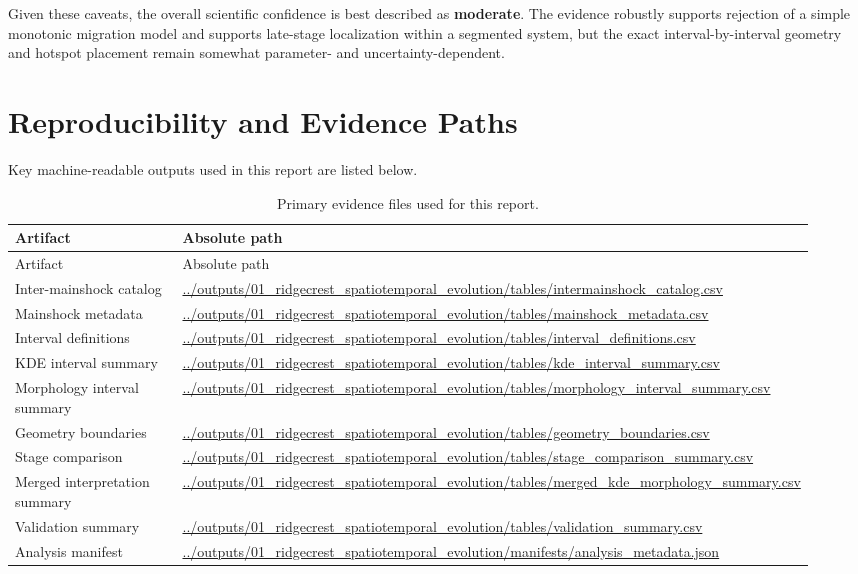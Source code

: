 \documentclass[11pt]{article}
\begin{document}
Given these caveats, the overall scientific confidence is best described as \textbf{moderate}. The evidence robustly supports rejection of a simple monotonic migration model and supports late-stage localization within a segmented system, but the exact interval-by-interval geometry and hotspot placement remain somewhat parameter- and uncertainty-dependent.

\section{Reproducibility and Evidence Paths}
Key machine-readable outputs used in this report are listed below.

\begin{longtable}{p{0.25\linewidth}p{0.68\linewidth}}
\caption{Primary evidence files used for this report.}\label{tab:files}\\
\toprule
Artifact & Absolute path \\
\midrule
\endfirsthead
\toprule
Artifact & Absolute path \\
\midrule
\endhead
Inter-mainshock catalog & \url{../outputs/01_ridgecrest_spatiotemporal_evolution/tables/intermainshock_catalog.csv} \\
Mainshock metadata & \url{../outputs/01_ridgecrest_spatiotemporal_evolution/tables/mainshock_metadata.csv} \\
Interval definitions & \url{../outputs/01_ridgecrest_spatiotemporal_evolution/tables/interval_definitions.csv} \\
KDE interval summary & \url{../outputs/01_ridgecrest_spatiotemporal_evolution/tables/kde_interval_summary.csv} \\
Morphology interval summary & \url{../outputs/01_ridgecrest_spatiotemporal_evolution/tables/morphology_interval_summary.csv} \\
Geometry boundaries & \url{../outputs/01_ridgecrest_spatiotemporal_evolution/tables/geometry_boundaries.csv} \\
Stage comparison & \url{../outputs/01_ridgecrest_spatiotemporal_evolution/tables/stage_comparison_summary.csv} \\
Merged interpretation summary & \url{../outputs/01_ridgecrest_spatiotemporal_evolution/tables/merged_kde_morphology_summary.csv} \\
Validation summary & \url{../outputs/01_ridgecrest_spatiotemporal_evolution/tables/validation_summary.csv} \\
Analysis manifest & \url{../outputs/01_ridgecrest_spatiotemporal_evolution/manifests/analysis_metadata.json} \\
\bottomrule
\end{longtable}
\end{document}
